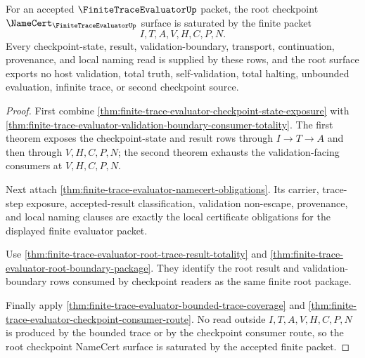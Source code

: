 \begin{theorem}
\label{thm:finite-trace-evaluator-root-checkpoint-namecert-saturation}
For an accepted $\FiniteTraceEvaluatorUp$ packet, the root checkpoint
$\NameCert_{\FiniteTraceEvaluatorUp}$ surface is saturated by the finite
packet
$$
I,T,A,V,H,C,P,N.
$$
Every checkpoint-state, result, validation-boundary, transport, continuation,
provenance, and local naming read is supplied by these rows, and the root
surface exports no host validation, total truth, self-validation, total
halting, unbounded evaluation, infinite trace, or second checkpoint source.
\end{theorem}
\begin{proof}
First combine \autoref{thm:finite-trace-evaluator-checkpoint-state-exposure}
with
\autoref{thm:finite-trace-evaluator-validation-boundary-consumer-totality}.
The first theorem exposes the checkpoint-state and result rows through
$I \to T \to A$ and then through $V,H,C,P,N$; the second theorem exhausts the
validation-facing consumers at $V,H,C,P,N$.

Next attach \autoref{thm:finite-trace-evaluator-namecert-obligations}. Its
carrier, trace-step exposure, accepted-result classification, validation
non-escape, provenance, and local naming clauses are exactly the local
certificate obligations for the displayed finite evaluator packet.

Use \autoref{thm:finite-trace-evaluator-root-trace-result-totality} and
\autoref{thm:finite-trace-evaluator-root-boundary-package}. They identify the
root result and validation-boundary rows consumed by checkpoint readers as
the same finite root package.

Finally apply \autoref{thm:finite-trace-evaluator-bounded-trace-coverage} and
\autoref{thm:finite-trace-evaluator-checkpoint-consumer-route}. No read
outside $I,T,A,V,H,C,P,N$ is produced by the bounded trace or by the
checkpoint consumer route, so the root checkpoint NameCert surface is
saturated by the accepted finite packet.
\end{proof}
